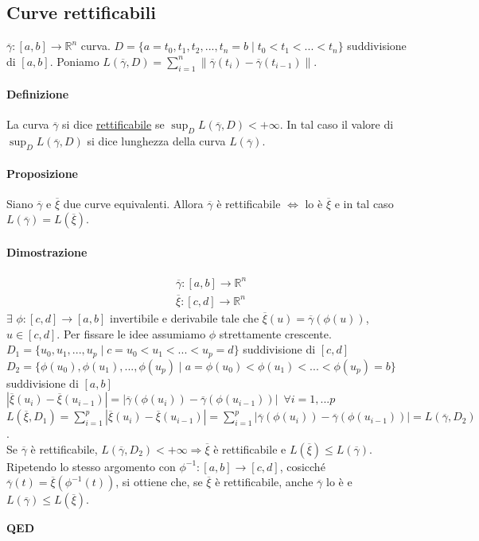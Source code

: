 \documentclass{article}
\newcommand{\R}{\mathbb{R}}
\begin{document}
\subsection{{Curve rettificabili}}
$\overline{\gamma}:[a,b]\rightarrow\R^n$ curva. $D=\{a=t_0,t_1,t_2,...,t_n=b\mid t_0<t_1<...<t_n\}$ suddivisione di $[a,b]$. Poniamo $L(\overline{\gamma},D)=\sum_{i=1}^{n}\| \overline{\gamma}(t_i)-\overline{\gamma}(t_{i-1}) \|$.

\paragraph{{Definizione}}
La curva $\overline{\gamma}$ si dice \underline{rettificabile} se $\sup_D L(\overline{\gamma},D)<+\infty$. In tal caso il valore di $\sup_D L(\overline{\gamma},D)$ si dice lunghezza della curva $L(\overline{\gamma})$. 

\paragraph{{Proposizione}}
Siano $\overline{\gamma}$ e $\overline{\xi}$ due curve equivalenti. Allora $\overline{\gamma}$ è rettificabile $\Leftrightarrow $ lo è $\overline{\xi}$ e in tal caso $L(\overline{\gamma})=L(\overline{\xi})$.

\paragraph{{Dimostrazione}}
\begin{align*}
    &\overline{\gamma}:[a,b]\rightarrow \R^n\\
    &\overline{\xi}:[c,d]\rightarrow \R^n
\end{align*}
$\exists \,\,\phi: [c,d]\rightarrow [a,b]$ invertibile e derivabile tale che $\overline{\xi}(u)=\overline{\gamma}(\phi(u))$, $u \in [c,d]$. Per fissare le idee assumiamo $\phi$ strettamente crescente.\\
$D_1=\{ u_0,u_1,...,u_p \mid c=u_0<u_1<...<u_p=d \}$ suddivisione di $[c,d]$\\
$D_2=\{\phi(u_0),\phi(u_1),...,\phi(u_p)\mid a = \phi (u_0)<\phi(u_1)<...<\phi(u_p)=b \}$ suddivisione di $[a,b]$\\
$|\overline{\xi} (u_i)-\overline{\xi}(u_{i-1})|=|\overline{\gamma}(\phi(u_i))-\overline{\gamma}(\phi(u_{i-1}))|\,\,\, \forall i=1,...p$\\
$L(\overline{\xi},D_1)=\sum_{i=1}^p|\overline{\xi}(u_i)-\overline{\xi}(u_{i-1})|=\sum_{i=1}^p|\overline{\gamma}(\phi(u_i))-\overline{\gamma}(\phi(u_{i-1}))|=L(\overline{\gamma},D_2)$.\\
Se $\overline{\gamma}$ è rettificabile, $L(\overline{\gamma},D_2)< +\infty \Rightarrow \overline{\xi}$ è rettificabile e $L(\overline{\xi})\leq L(\overline{\gamma})$.\\
Ripetendo lo stesso argomento con $\phi^{-1}:[a,b]\rightarrow [c,d]$, cosicché $\overline{\gamma}(t)=\overline{\xi}(\phi^{-1}(t))$, si ottiene che, se $\overline{\xi}$ è rettificabile, anche $\overline{\gamma}$ lo è e $L(\overline{\gamma})\leq L(\overline{\xi})$.
\begin{flushright}
 \textbf{QED}
\end{flushright}
\end{document}
